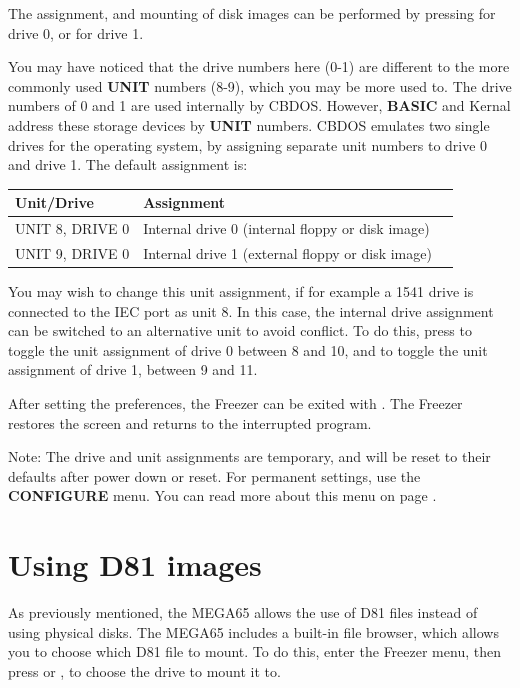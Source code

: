 The assignment, and mounting of disk images can be performed by pressing
 for drive 0, or  for drive 1.

You may have noticed that the drive numbers here (0-1) are different to the more commonly used {\bf UNIT}
numbers (8-9), which you may be more used to. The drive numbers of 0 and 1 are used internally by CBDOS.
However, {\bf BASIC} and Kernal address these storage devices by {\bf UNIT} numbers. CBDOS emulates two single drives for
the operating system, by assigning separate unit numbers to drive 0 and drive 1.
The default assignment is:

\begin{center}
\begin{tabular}{|l|l|l|}
\hline
{\bf Unit/Drive} & {\bf Assignment} \\
\hline
UNIT 8, DRIVE 0  & Internal drive 0 (internal floppy or disk image) \\
UNIT 9, DRIVE 0 & Internal drive 1 (external floppy or disk image) \\
\hline
\end{tabular}
\end{center}


You may wish to change this unit assignment, if for example
a 1541 drive is connected to the IEC port as unit 8.
In this case, the internal drive assignment can be switched to an alternative unit
to avoid conflict. To do this, press  to toggle the unit assignment of drive 0
between 8 and 10, and  to toggle the unit assignment of drive 1, between 9 and 11.

After setting the preferences, the Freezer can be exited
with . The Freezer restores the screen and
returns to the interrupted program.

Note: The drive and unit assignments are temporary, and will be reset to their defaults
after power down or reset. For permanent settings, use the {\bf CONFIGURE}
menu. You can read more about this menu on page \pageref{configuring-chipset}.

\section{Using D81 images}
As previously mentioned, the MEGA65 allows the use of D81 files instead of using physical disks. The MEGA65 includes a
built-in file browser, which allows you to choose which D81 file to mount. To do this, enter the Freezer menu,
then press  or , to choose the drive to mount it to.

